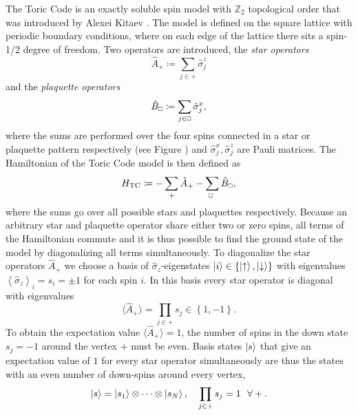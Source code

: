 The Toric Code is an exactly soluble spin model with $\mathbb{Z}_2$ topological order that was introduced by Alexei Kitaev \cite{cite:fault_tolerant_quantum_computation_by_anyons}. The model is defined on the square lattice with periodic boundary conditions, where on each edge of the lattice there sits a spin-1/2 degree of freedom. Two operators are introduced, the \textit{star operators}
\begin{equation}
	\label{eq:star_operator}
	\hat{A}_+ \coloneqq \sum_{j\in+}\hat{\sigma}_j^z
\end{equation}
and the \textit{plaquette operators}
\begin{equation}
	\label{eq:plaquette_operator}
	\hat{B}_{\scalebox{0.6}{$\square$}} \coloneqq \sum_{j\in \scalebox{0.6}{$\square$}} \hat{\sigma}_j^x,
\end{equation}
where the sums are performed over the four spins connected in a star or plaquette pattern respectively (see Figure ) and $\hat{\sigma}_j^x, \hat{\sigma}_j^z$ are Pauli matrices. The Hamiltonian of the Toric Code model is then defined as
\begin{equation}
	\label{eq:toric_code_hamiltonian}
	H_\text{TC} \coloneqq -\sum_+\hat{A}_+ - \sum_{\scalebox{0.6}{$\square$}}\hat{B}_{\scalebox{0.6}{$\square$}},
\end{equation}
where the sums go over all possible stars and plaquettes respectively. Because an arbitrary star and plaquette operator share either two or zero spins, all terms of the Hamiltonian commute and it is thus possible to find the ground state of the model by diagonalizing all terms simultaneously. To diagonalize the star operators $\hat{A}_+$ we choose a basis of $\hat{\sigma}_z$-eigenstates $\ket{i} \in \left\{\ket{\uparrow}, \ket{\downarrow}\right\}$ with eigenvalues $\left\langle\hat{\sigma}_z\right\rangle_i = s_i = \pm 1$ for each spin $i$. In this basis every star operator is diagonal with eigenvalues
\begin{equation}
	\label{eq:toric_code_star_operator_expectation value}
	\langle \hat{A}_+\rangle = \prod_{j\in+}s_j \in \left\{1, -1\right\}.
\end{equation}
To obtain the expectation value $\langle \hat{A}_+\rangle = 1$, the number of spins in the down state $s_j = -1$ around the vertex $+$ must be even. Basis states $\ket{s}$ that give an expectation value of $1$ for every star operator simultaneously are thus the states with an even number of down-spins around every vertex,
\begin{equation}
	\label{eq:toric_code_A_operator_condition}
	\ket{s} = \ket{s_1} \otimes \dots \otimes \ket{s_N}, \quad \prod_{j\in+}s_j = 1 \,\,\,\,\forall +.
\end{equation}
